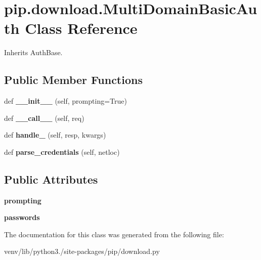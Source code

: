 \hypertarget{classpip_1_1download_1_1_multi_domain_basic_auth}{}\section{pip.\+download.\+Multi\+Domain\+Basic\+Auth Class Reference}
\label{classpip_1_1download_1_1_multi_domain_basic_auth}


Inherits Auth\+Base.

\subsection*{Public Member Functions}
\begin{DoxyCompactItemize}
\item 
\mbox{\label{classpip_1_1download_1_1_multi_domain_basic_auth_a4412218ccd3b0e43db6efbcf2842e9c5}} 
def {\bfseries \+\_\+\+\_\+init\+\_\+\+\_\+} (self, prompting=True)
\item 
\mbox{\label{classpip_1_1download_1_1_multi_domain_basic_auth_aaa9a02eb1ab9c14f09c94f932f83c4e7}} 
def {\bfseries \+\_\+\+\_\+call\+\_\+\+\_\+} (self, req)
\item 
\mbox{\label{classpip_1_1download_1_1_multi_domain_basic_auth_aa189873d45a6c8e318d9e6e5296c3bd1}} 
def {\bfseries handle\+\_} (self, resp, kwargs)
\item 
\mbox{\label{classpip_1_1download_1_1_multi_domain_basic_auth_a48a249f6f255dc6a7eddf1271f3c22ba}} 
def {\bfseries parse\+\_\+credentials} (self, netloc)
\end{DoxyCompactItemize}
\subsection*{Public Attributes}
\begin{DoxyCompactItemize}
\item 
\mbox{\label{classpip_1_1download_1_1_multi_domain_basic_auth_a7a55b920f14b3e8d6e3594c6a718791c}} 
{\bfseries prompting}
\item 
\mbox{\label{classpip_1_1download_1_1_multi_domain_basic_auth_a6c1f03e50cdf27d2a313ff791e819b5a}} 
{\bfseries passwords}
\end{DoxyCompactItemize}


The documentation for this class was generated from the following file\+:\begin{DoxyCompactItemize}
\item 
venv/lib/python3./site-\/packages/pip/download.\+py\end{DoxyCompactItemize}

